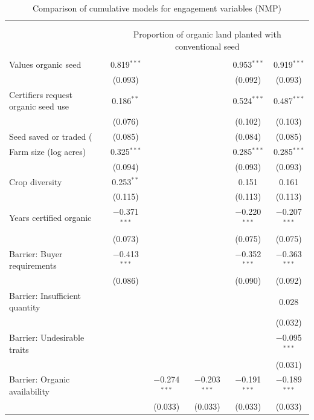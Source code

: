 
\begin{table}[!h] \centering 
  \caption{Comparison of cumulative models for engagement variables (NMP)} 
  \label{} 
\begin{tabular}{@{\extracolsep{5pt}}lccccc} 
\\[-1.8ex]\hline 
\hline \\[-1.8ex] 
\\[-1.8ex] & \multicolumn{5}{c}{Proportion of organic land planted with conventional seed} \\ 
\hline \\[-1.8ex] 
 Values organic seed & 0.819$^{***}$ &  &  & 0.953$^{***}$ & 0.919$^{***}$ \\ 
  & (0.093) &  &  & (0.092) & (0.093) \\ 
  Certifiers request organic seed use & 0.186$^{**}$ &  &  & 0.524$^{***}$ & 0.487$^{***}$ \\ 
  & (0.076) &  &  & (0.102) & (0.103) \\ 
  Seed saved or traded (%
  & (0.085) &  &  & (0.084) & (0.085) \\ 
  Farm size (log acres) & 0.325$^{***}$ &  &  & 0.285$^{***}$ & 0.285$^{***}$ \\ 
  & (0.094) &  &  & (0.093) & (0.093) \\ 
  Crop diversity & 0.253$^{**}$ &  &  & 0.151 & 0.161 \\ 
  & (0.115) &  &  & (0.113) & (0.113) \\ 
  Years certified organic & $-$0.371$^{***}$ &  &  & $-$0.220$^{***}$ & $-$0.207$^{***}$ \\ 
  & (0.073) &  &  & (0.075) & (0.075) \\ 
  Barrier: Buyer requirements & $-$0.413$^{***}$ &  &  & $-$0.352$^{***}$ & $-$0.363$^{***}$ \\ 
  & (0.086) &  &  & (0.090) & (0.092) \\ 
  Barrier: Insufficient quantity &  &  &  &  & 0.028 \\ 
  &  &  &  &  & (0.032) \\ 
  Barrier: Undesirable traits &  &  &  &  & $-$0.095$^{***}$ \\ 
  &  &  &  &  & (0.031) \\ 
  Barrier: Organic availability &  & $-$0.274$^{***}$ & $-$0.203$^{***}$ & $-$0.191$^{***}$ & $-$0.189$^{***}$ \\ 
  &  & (0.033) & (0.033) & (0.033) & (0.033) \\ 

\end{tabular}
\end{table}
